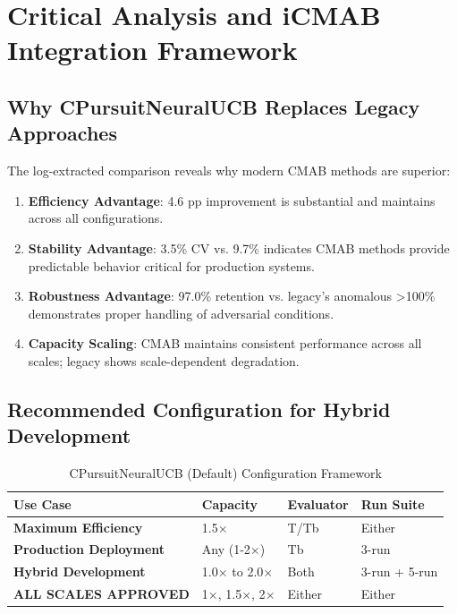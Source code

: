 \documentclass[12pt,a4paper]{article}
\newcommand{\success}[1]{\textcolor{accentgreen}{\textbf{#1}}}
\begin{document}
\section{Critical Analysis and iCMAB Integration Framework}

\subsection{Why CPursuitNeuralUCB Replaces Legacy Approaches}

The log-extracted comparison reveals why modern CMAB methods are superior:

\begin{enumerate}
    \item \success{\textbf{Efficiency Advantage}}: 4.6 pp improvement is substantial and maintains across all configurations.
    
    \item \success{\textbf{Stability Advantage}}: 3.5\% CV vs. 9.7\% indicates CMAB methods provide predictable behavior critical for production systems.
    
    \item \success{\textbf{Robustness Advantage}}: 97.0\% retention vs. legacy's anomalous >100\% demonstrates proper handling of adversarial conditions.
    
    \item \success{\textbf{Capacity Scaling}}: CMAB maintains consistent performance across all scales; legacy shows scale-dependent degradation.
\end{enumerate}

\subsection{Recommended Configuration for Hybrid Development}

\begin{table}[H]
\centering
\caption{CPursuitNeuralUCB (Default) Configuration Framework}
\begin{tabular}{@{}llll@{}}
\toprule
\textbf{Use Case} & \textbf{Capacity} & \textbf{Evaluator} & \textbf{Run Suite} \\
\midrule
\success{Maximum Efficiency} & 1.5$\times$ & T/Tb & Either \\
\success{Production Deployment} & Any (1-2$\times$) & Tb & 3-run \\
\success{Hybrid Development} & 1.0$\times$ to 2.0$\times$ & Both & 3-run + 5-run \\
\success{ALL SCALES APPROVED} & 1$\times$, 1.5$\times$, 2$\times$ & Either & Either \\
\bottomrule
\end{tabular}
\end{table}
\end{document}
